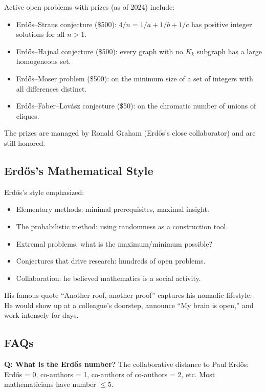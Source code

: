 Active open problems with prizes (as of 2024) include:
\begin{itemize}
    \item Erd\H{o}s--Straus conjecture (\$500): $4/n = 1/a + 1/b + 1/c$ has positive integer solutions for all $n > 1$.
    \item Erd\H{o}s--Hajnal conjecture (\$500): every graph with no $K_k$ subgraph has a large homogeneous set.
    \item Erd\H{o}s--Moser problem (\$500): on the minimum size of a set of integers with all differences distinct.
    \item Erd\H{o}s--Faber--Lov\'{a}sz conjecture (\$50): on the chromatic number of unions of cliques.
\end{itemize}

The prizes are managed by Ronald Graham (Erd\H{o}s's close collaborator) and are still honored.

\subsection{Erd\H{o}s's Mathematical Style}

Erd\H{o}s's style emphasized:
\begin{itemize}
    \item Elementary methods: minimal prerequisites, maximal insight.
    \item The probabilistic method: using randomness as a construction tool.
    \item Extremal problems: what is the maximum/minimum possible?
    \item Conjectures that drive research: hundreds of open problems.
    \item Collaboration: he believed mathematics is a social activity.
\end{itemize}

His famous quote ``Another roof, another proof'' captures his nomadic lifestyle. He would show up at a colleague's doorstep, announce ``My brain is open,'' and work intensely for days.

\subsection*{FAQs}

\noindent\textbf{Q: What is the Erd\H{o}s number?} The collaborative distance to Paul Erd\H{o}s: Erd\H{o}s = 0, co-authors = 1, co-authors of co-authors = 2, etc. Most mathematicians have number $\leq 5$.

